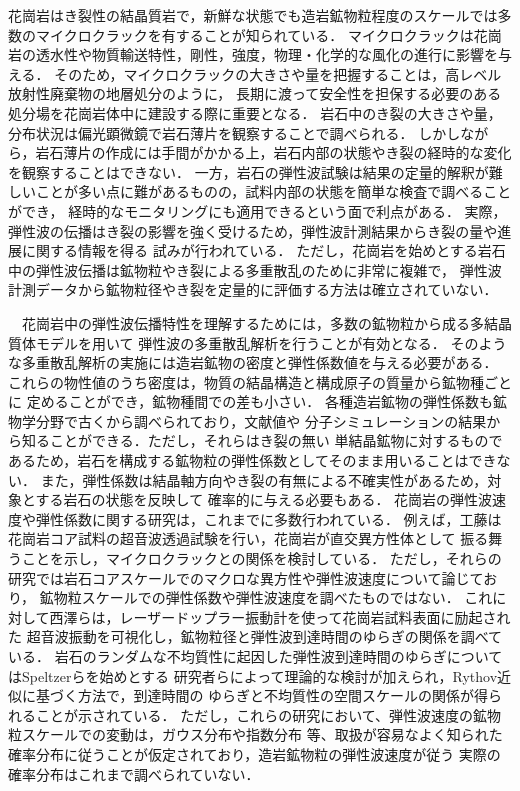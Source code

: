 花崗岩はき裂性の結晶質岩で，新鮮な状態でも造岩鉱物粒程度のスケールでは多数のマイクロクラックを有することが知られている\cite{Kudo1-Takagi}．
マイクロクラックは花崗岩の透水性や物質輸送特性，剛性，強度，物理・化学的な風化の進行に影響を与える．
そのため，マイクロクラックの大きさや量を把握することは，高レベル放射性廃棄物の地層処分のように，
長期に渡って安全性を担保する必要のある処分場を花崗岩体中に建設する際に重要となる．
%
岩石中のき裂の大きさや量，分布状況は偏光顕微鏡で岩石薄片を観察することで調べられる．
しかしながら，岩石薄片の作成には手間がかかる上，岩石内部の状態やき裂の経時的な変化を観察することはできない．
一方，岩石の弾性波試験は結果の定量的解釈が難しいことが多い点に難があるものの，試料内部の状態を簡単な検査で調べることができ，
経時的なモニタリングにも適用できるという面で利点がある．
実際，弾性波の伝播はき裂の影響を強く受けるため，弾性波計測結果からき裂の量や進展に関する情報を得る
試みが行われている\cite{Griffiths}．
ただし，花崗岩を始めとする岩石中の弾性波伝播は鉱物粒やき裂による多重散乱のために非常に複雑で\cite{Sato}，
弾性波計測データから鉱物粒径やき裂を定量的に評価する方法は確立されていない．

　花崗岩中の弾性波伝播特性を理解するためには，多数の鉱物粒から成る多結晶質体モデルを用いて
弾性波の多重散乱解析を行うことが有効となる\cite{FEM}．
そのような多重散乱解析の実施には造岩鉱物の密度と弾性係数値を与える必要がある．
これらの物性値のうち密度は，物質の結晶構造と構成原子の質量から鉱物種ごとに
定めることができ，鉱物種間での差も小さい．
各種造岩鉱物の弾性係数も鉱物学分野で古くから調べられており，文献値\cite{}や
分子シミュレーション\cite{Kawamura}の結果から知ることができる．ただし，それらはき裂の無い
単結晶鉱物に対するものであるため，岩石を構成する鉱物粒の弾性係数としてそのまま用いることはできない．
また，弾性係数は結晶軸方向やき裂の有無による不確実性があるため，対象とする岩石の状態を反映して
確率的に与える必要もある．
花崗岩の弾性波速度や弾性係数に関する研究は，これまでに多数行われている．
例えば，工藤\cite{kudo1}は花崗岩コア試料の超音波透過試験を行い，花崗岩が直交異方性体として
振る舞うことを示し，マイクロクラックとの関係を検討している．
ただし，それらの研究では岩石コアスケールでのマクロな異方性や弾性波速度について論じており，
鉱物粒スケールでの弾性係数や弾性波速度を調べたものではない．
これに対して西澤ら\cite{}は，レーザードップラー振動計を使って花崗岩試料表面に励起された
超音波振動を可視化し，鉱物粒径と弾性波到達時間のゆらぎの関係を調べている．
岩石のランダムな不均質性に起因した弾性波到達時間のゆらぎについてはSpeltzerらを始めとする
研究者らによって理論的な検討が加えられ，Rythov近似に基づく方法で，到達時間の
ゆらぎと不均質性の空間スケールの関係が得られることが示されている．
ただし，これらの研究において、弾性波速度の鉱物粒スケールでの変動は，ガウス分布や指数分布
等、取扱が容易なよく知られた確率分布に従うことが仮定されており，造岩鉱物粒の弾性波速度が従う
実際の確率分布はこれまで調べられていない．

